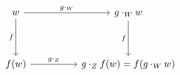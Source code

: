\[\begin{tikzcd}
	w && {g \cdot_{W} w} \\
	\\
	{f(w)} && {g \cdot_{Z} f(w) = f(g \cdot_{W} w)}
	\arrow["{g \cdot_{W}}", from=1-1, to=1-3]
	\arrow["f"', from=1-1, to=3-1]
	\arrow["f"', from=1-3, to=3-3]
	\arrow["{g \cdot_{Z}}", from=3-1, to=3-3]
\end{tikzcd}\]
